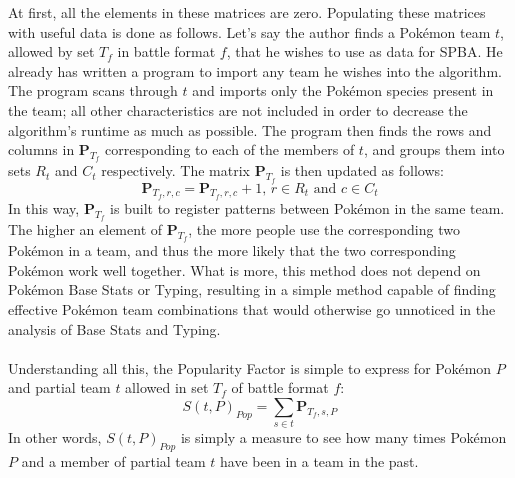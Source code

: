 \documentclass{article}
\begin{document}
At first, all the elements in these matrices are zero. Populating these matrices with useful data is done as follows. Let's say the author finds a Pok\'emon team $t$, allowed by set $T_f$ in battle format $f$, that he wishes to use as data for SPBA. He already has written a program to import any team he wishes into the algorithm. The program scans through $t$ and imports only the Pok\'emon species present in the team; all other characteristics are not included in order to decrease the algorithm's runtime as much as possible. The program then finds the rows and columns in $\textbf{P}_{T_f}$ corresponding to each of the members of $t$, and groups them into sets $R_t$ and $C_t$ respectively. The matrix $\textbf{P}_{T_f}$ is then updated as follows:
\begin{equation*}
	\textbf{P}_{T_f,r,c}=\textbf{P}_{T_f,r,c}+1\text{, }r\in R_t\text{ and }c\in C_t
\end{equation*}
In this way, $\textbf{P}_{T_f}$ is built to register patterns between Pok\'emon in the same team. The higher an element of $\textbf{P}_{T_f}$, the more people use the corresponding two Pok\'emon in a team, and thus the more likely that the two corresponding Pok\'emon work well together. What is more, this method does not depend on Pok\'emon Base Stats or Typing, resulting in a simple method capable of finding effective Pok\'emon team combinations that would otherwise go unnoticed in the analysis of Base Stats and Typing.\\\\
Understanding all this, the Popularity Factor is simple to express for Pok\'emon $P$ and partial team $t$ allowed in set $T_f$ of battle format $f$:
\begin{equation}\label{popScoreEqn}
	S(t,P)_{Pop}=\sum_{s\in t}\textbf{P}_{T_f,s,P}
\end{equation}
In other words, $S(t,P)_{Pop}$ is simply a measure to see how many times Pok\'emon $P$ and a member of partial team $t$ have been in a team in the past.
\end{document}

